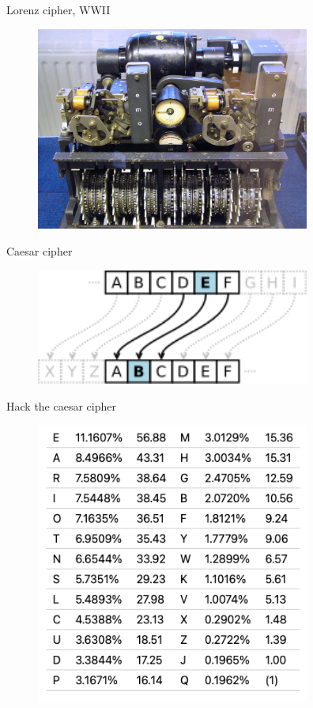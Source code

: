 \documentclass[10pt,pdf,hyperref={unicode}]{beamer}
\begin{document}
\begin{frame}{Lorenz cipher, WWII}
 \begin{figure} 
   \includegraphics[width=90mm,scale=0.5]{class_crypto.jpg}
  \end{figure}
\end{frame}


\begin{frame}{Caesar cipher}
 \begin{figure} 
   \includegraphics[width=90mm,scale=0.5]{caesar_cipher.png}
  \end{figure}
\end{frame}

\begin{frame}{Hack the caesar cipher}
 \begin{figure} 
   \includegraphics[width=90mm,scale=0.5]{english_letters}
  \end{figure}
\end{frame}
\end{document}
